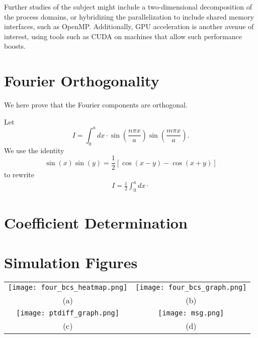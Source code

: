 \documentclass[reprint, amsmath, amssymb, aps, floatfix]{revtex4-1}
\begin{document}
Further studies of the subject might include a two-dimensional decomposition of the process domains, or hybridizing the parallelization to include shared memory interfaces, such as OpenMP. Additionally, GPU acceleration is another avenue of interest, using tools such as CUDA on machines that allow such performance boosts.



\appendix
\section{Fourier Orthogonality}

We here prove that the Fourier components are orthogonal.

Let \begin{equation}
I = \int_{0}^a dx\cdot \sin\left(\frac{n\pi x}{a}\right)\sin\left(\frac{m\pi x}{a}\right).
\end{equation} We use the identity \begin{equation}
\sin(x)\sin(y)=\frac{1}{2}\left[\cos(x-y)-\cos(x+y)\right]
\end{equation} to rewrite \begin{equation}
\begin{aligned}
I = \frac{1}{2}\int_0^a dx\cdot
\end{aligned}
\end{equation}

\section{Coefficient Determination}



\section{Simulation Figures}

\begin{table}
\begin{tabular}{cc}
	\texttt{[image: four\_bcs\_heatmap.png]}
&
	\texttt{[image: four\_bcs\_graph.png]}\\ (a)&(b)\\

	\texttt{[image: ptdiff\_graph.png]} 
	&
	\texttt{[image: msg.png]} \\ (c)
& (d)\\
\end{tabular}
\end{table}


\end{document}
